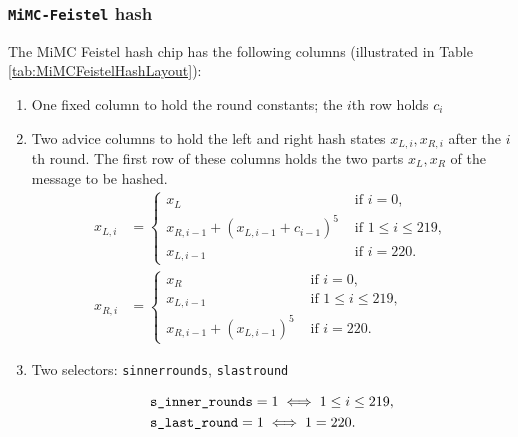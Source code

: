 \documentclass[10pt]{article}
\begin{document}
\subsubsection{\texttt{MiMC-Feistel} hash}
The MiMC Feistel hash chip has the following columns (illustrated in Table \ref{tab:MiMCFeistelHashLayout}):
\begin{enumerate}
  \item One fixed column to hold the round constants; the $i$th row holds $c_i$
  \item Two advice columns to hold the left and right hash states $x_{L,i}, x_{R,i}$ after the $i$th round. The first row of these columns holds the two parts $x_L, x_R$ of the message to be hashed.
    \begin{align*}
      x_{L,i} &= 
      \begin{cases}
        x_L & \text{ if } i = 0,\\
        x_{R, i-1} + \left( x_{L,i-1}+c_{i-1}\right)^5  & \text{ if } 1 \le i \le  219,\\
        x_{L,i-1}  & \text{ if } i=220.
      \end{cases}\\
      x_{R,i} &= 
      \begin{cases}
        x_R & \text{ if } i = 0,\\
         x_{L,i-1} & \text{ if } 1 \le i \le  219,\\
         x_{R,i-1} + \left( x_{L,i-1}\right)^5  & \text{ if } i=220.
      \end{cases}
    \end{align*}
  \item Two selectors: \texttt{s\textunderscore inner\textunderscore rounds}, \texttt{s\textunderscore last\textunderscore round}

    \begin{align*}
      & \texttt{s\textunderscore inner\textunderscore rounds} = 1  \iff 1 \le i\le 219,\\
      & \texttt{s\textunderscore last\textunderscore round} = 1  \iff 1 = 220.
    \end{align*}
\end{enumerate}
\end{document}
